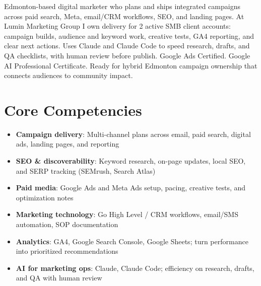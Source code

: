 \documentclass[11pt,a4paper,sans]{moderncv}
\begin{document}
\makecvtitle

\vspace{6pt}
\small{Edmonton-based digital marketer who plans and ships integrated campaigns across paid search, Meta, email/CRM workflows, SEO, and landing pages. At Lumin Marketing Group I own delivery for 2 active SMB client accounts: campaign builds, audience and keyword work, creative tests, GA4 reporting, and clear next actions. Uses Claude and Claude Code to speed research, drafts, and QA checklists, with human review before publish. Google Ads Certified. Google AI Professional Certificate. Ready for hybrid Edmonton campaign ownership that connects audiences to community impact.}

\section{Core Competencies}
\vspace{1pt}
\begin{itemize}
\item \textbf{Campaign delivery}: Multi-channel plans across email, paid search, digital ads, landing pages, and reporting
\item \textbf{SEO \& discoverability}: Keyword research, on-page updates, local SEO, and SERP tracking (SEMrush, Search Atlas)
\item \textbf{Paid media}: Google Ads and Meta Ads setup, pacing, creative tests, and optimization notes
\item \textbf{Marketing technology}: Go High Level / CRM workflows, email/SMS automation, SOP documentation
\item \textbf{Analytics}: GA4, Google Search Console, Google Sheets; turn performance into prioritized recommendations
\item \textbf{AI for marketing ops}: Claude, Claude Code; efficiency on research, drafts, and QA with human review
\end{itemize}
\end{document}
